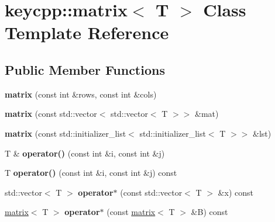 \hypertarget{classkeycpp_1_1matrix}{\section{keycpp\-:\-:matrix$<$ T $>$ Class Template Reference}
\label{classkeycpp_1_1matrix}
}
\subsection*{Public Member Functions}
\begin{DoxyCompactItemize}
\item 
\hypertarget{classkeycpp_1_1matrix_a7846ea93147dca75e5a8fbea7219c35d}{{\bfseries matrix} (const int \&rows, const int \&cols)}\label{classkeycpp_1_1matrix_a7846ea93147dca75e5a8fbea7219c35d}

\item 
\hypertarget{classkeycpp_1_1matrix_ad843813ecfec7c08b9259957406e94e2}{{\bfseries matrix} (const std\-::vector$<$ std\-::vector$<$ T $>$$>$ \&mat)}\label{classkeycpp_1_1matrix_ad843813ecfec7c08b9259957406e94e2}

\item 
\hypertarget{classkeycpp_1_1matrix_ad8797411bc30cc0d42e0e9b8bcc899d7}{{\bfseries matrix} (const std\-::initializer\-\_\-list$<$ std\-::initializer\-\_\-list$<$ T $>$$>$ \&lst)}\label{classkeycpp_1_1matrix_ad8797411bc30cc0d42e0e9b8bcc899d7}

\item 
\hypertarget{classkeycpp_1_1matrix_a9613f3ed2de6b240b982df895f958c56}{T \& {\bfseries operator()} (const int \&i, const int \&j)}\label{classkeycpp_1_1matrix_a9613f3ed2de6b240b982df895f958c56}

\item 
\hypertarget{classkeycpp_1_1matrix_a2c51fa98ec9a48f18af144677c36ee98}{T {\bfseries operator()} (const int \&i, const int \&j) const }\label{classkeycpp_1_1matrix_a2c51fa98ec9a48f18af144677c36ee98}

\item 
\hypertarget{classkeycpp_1_1matrix_a8a60e529610d6ad6ae5f34b8cd5199bd}{std\-::vector$<$ T $>$ {\bfseries operator$\ast$} (const std\-::vector$<$ T $>$ \&x) const }\label{classkeycpp_1_1matrix_a8a60e529610d6ad6ae5f34b8cd5199bd}

\item 
\hypertarget{classkeycpp_1_1matrix_add1f4ca03e1cce57574c905ab7ca89fe}{\hyperlink{classkeycpp_1_1matrix}{matrix}$<$ T $>$ {\bfseries operator$\ast$} (const \hyperlink{classkeycpp_1_1matrix}{matrix}$<$ T $>$ \&B) const }\label{classkeycpp_1_1matrix_add1f4ca03e1cce57574c905ab7ca89fe}


\end{DoxyCompactItemize}
